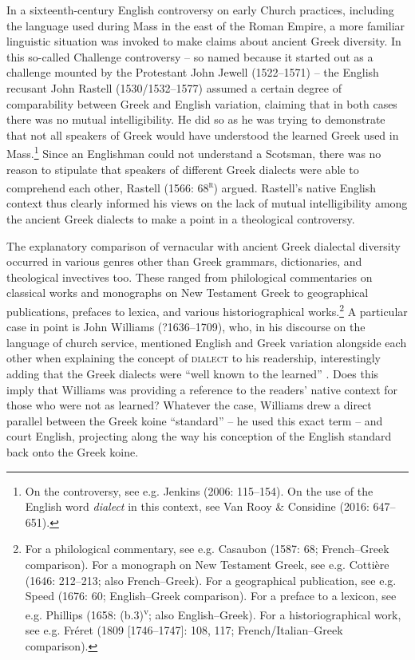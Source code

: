 \documentclass[output=paper]{langsci/langscibook}
\begin{document}
In a sixteenth-century English controversy on early Church practices, including the language used during Mass in the east of the Roman Empire, a more familiar linguistic situation was invoked to make claims about ancient Greek diversity. In this so-called Challenge controversy – so named because it started out as a challenge mounted by the Protestant John Jewell (1522–1571) – the English recusant John Rastell (1530/1532–1577) assumed a certain degree of comparability between Greek and English variation, claiming that in both cases there was no mutual intelligibility. He did so as he was trying to demonstrate that not all speakers of Greek would have understood the learned Greek used in Mass.\footnote{On the controversy, see e.g. Jenkins (2006: 115–154). On the use of the English word \textit{dialect} in this context, see Van Rooy \& Considine (2016: 647–651).} Since an Englishman could not understand a Scotsman, there was no reason to stipulate that speakers of different Greek dialects were able to comprehend each other, Rastell (1566: 68\textsc{\textsuperscript{r}}) argued. Rastell’s native English context thus clearly informed his views on the lack of mutual intelligibility among the ancient Greek dialects to make a point in a theological controversy.

The explanatory comparison of vernacular with ancient Greek dialectal diversity occurred in various genres other than Greek grammars, dictionaries, and theological invectives too. These ranged from philological commentaries on classical works and monographs on New Testament Greek to geographical publications, prefaces to lexica, and various historiographical works.\footnote{For a philological commentary, see e.g. Casaubon (1587: 68; French–Greek comparison). For a monograph on New Testament Greek, see e.g. Cottière (1646: 212–213; also French–Greek). For a geographical publication, see e.g. Speed (1676: 60; English–Greek comparison). For a preface to a lexicon, see e.g. Phillips (1658: (b.3)\textsuperscript{v}\textsc{;} also English–Greek). For a historiographical work, see e.g. Fréret (1809 [1746–1747]: 108, 117; French/Italian–Greek comparison).} A particular case in point is John Williams (?1636–1709), who, in his discourse on the language of church service, mentioned English and Greek variation alongside each other when explaining the concept of \textsc{dialect} to his readership, interestingly adding that the Greek dialects were “well known to the learned” \citep[5]{Williams1685}. Does this imply that Williams was providing a reference to the readers’ native context for those who were not as learned? Whatever the case, Williams drew a direct parallel between the Greek koine “standard” – he used this exact term – and court English, projecting along the way his conception of the English standard back onto the Greek koine.
\end{document}
